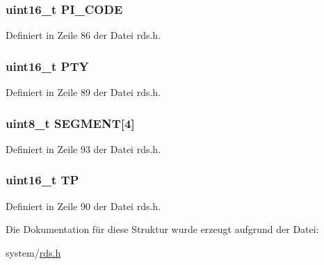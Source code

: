 \subsubsection[{P\+I\+\_\+\+C\+O\+D\+E}]{\setlength{\rightskip}{0pt plus 5cm}uint16\+\_\+t P\+I\+\_\+\+C\+O\+D\+E}\label{structgroup__2a_a5cd9b1f6413028425796c1129aa8fd87}


Definiert in Zeile 86 der Datei rds.\+h.

\hypertarget{structgroup__2a_a0474967478fbbc2c71b800d2e0132d45}{}
\subsubsection[{P\+T\+Y}]{\setlength{\rightskip}{0pt plus 5cm}uint16\+\_\+t P\+T\+Y}\label{structgroup__2a_a0474967478fbbc2c71b800d2e0132d45}


Definiert in Zeile 89 der Datei rds.\+h.

\hypertarget{structgroup__2a_a51d200a5620dec8e6cd7a76c63d03ed1}{}
\subsubsection[{S\+E\+G\+M\+E\+N\+T}]{\setlength{\rightskip}{0pt plus 5cm}uint8\+\_\+t S\+E\+G\+M\+E\+N\+T\mbox{[}4\mbox{]}}\label{structgroup__2a_a51d200a5620dec8e6cd7a76c63d03ed1}


Definiert in Zeile 93 der Datei rds.\+h.

\hypertarget{structgroup__2a_ab9e634c63b0d95a96716d5f6d7f06d72}{}
\subsubsection[{T\+P}]{\setlength{\rightskip}{0pt plus 5cm}uint16\+\_\+t T\+P}\label{structgroup__2a_ab9e634c63b0d95a96716d5f6d7f06d72}


Definiert in Zeile 90 der Datei rds.\+h.



Die Dokumentation für diese Struktur wurde erzeugt aufgrund der Datei\+:\begin{DoxyCompactItemize}
\item 
system/\hyperlink{rds_8h}{rds.\+h}\end{DoxyCompactItemize}
